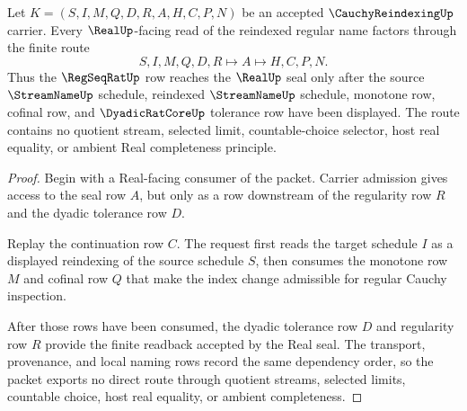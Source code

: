 \begin{theorem}
\label{thm:cauchy-reindexing-regseqrat-real-handoff}
Let $K=(S,I,M,Q,D,R,A,H,C,P,N)$ be an accepted $\CauchyReindexingUp$ carrier. Every $\RealUp$-facing read of the reindexed regular name factors through the finite route
$$
S,I,M,Q,D,R \longmapsto A \longmapsto H,C,P,N .
$$
Thus the $\RegSeqRatUp$ row reaches the $\RealUp$ seal only after the source $\StreamNameUp$ schedule, reindexed $\StreamNameUp$ schedule, monotone row, cofinal row, and $\DyadicRatCoreUp$ tolerance row have been displayed. The route contains no quotient stream, selected limit, countable-choice selector, host real equality, or ambient Real completeness principle.
\end{theorem}
\begin{proof}
Begin with a Real-facing consumer of the packet. Carrier admission gives access to the seal row $A$, but only as a row downstream of the regularity row $R$ and the dyadic tolerance row $D$.

Replay the continuation row $C$. The request first reads the target schedule $I$ as a displayed reindexing of the source schedule $S$, then consumes the monotone row $M$ and cofinal row $Q$ that make the index change admissible for regular Cauchy inspection.

After those rows have been consumed, the dyadic tolerance row $D$ and regularity row $R$ provide the finite readback accepted by the Real seal. The transport, provenance, and local naming rows record the same dependency order, so the packet exports no direct route through quotient streams, selected limits, countable choice, host real equality, or ambient completeness.
\end{proof}

